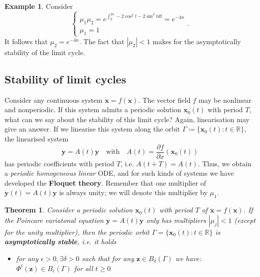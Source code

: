 \documentclass[hidelinks,a4paper, 11pt]{article}
\theoremstyle{plain}
\newtheorem{theorem}{Theorem}
\theoremstyle{break}
\theoremstyle{plain}
\theoremstyle{definition}
\newtheorem*{example}{Example}
\begin{document}
{\begin{example}
	Consider
	\[
		\begin{cases}
			\mu_1 \mu_2 = e^{\int^{2\pi}_0 -2\cos^2t - 2\sin^2 t dt} = e^{-4n} \\
			\mu_1 = 1
		\end{cases}.
	\]
	It follows that $\mu_2 = e^{-4n}$. The fact that $|\mu_2| < 1$ makes for the asymptotically stability of the limit cycle.
\end{example}

 
\subsection{Stability of limit cycles}

Consider any continuous system $\mathbf{\dot x} = f(\mathbf x)$. The vector field $f$ may be nonlinear and nonperiodic. If this system admits a periodic solution $\mathbf x_0(t)$ with period $T$, what can we say about the stability of this limit cycle? Again, linearisation may give an answer. If we linearise this system along the orbit $\Gamma \coloneqq \{ \mathbf x_0(t) : t \in \mathbb R \}$, the linearised system
\[
	\mathbf{\dot y} = A(t)\mathbf y \quad \text{with} \quad A(t) = \frac{\partial f}{\partial x}(\mathbf x_0(t)) \tag{Poincare variational equation}
\] 
has periodic coefficients with period $T$, i.e. $A(t+T) = A(t)$. Thus, we obtain a \emph{periodic homogeneous linear} ODE, and for such kinds of systems we have developed the \textbf{Floquet theory}. Remember that one multiplier of $\mathbf{\dot y}(t) = A(t)\mathbf y$ is always unity; we will denote this multiplier by $\mu_1$.

\begin{theorem}\label{chapter:poincare-map-theorem}
	Consider a periodic solution $\mathbf x_0(t)$ with period $T$ of $\mathbf{\dot x} = f(\mathbf x)$. If the Poincare variatonal equation $\mathbf{\dot y} = A(t)\mathbf y$ only has multipliers $|\mu_j| < 1$ (except for the unity multiplier), then the periodic orbit $\Gamma = \{ \mathbf x_0(t) : t \in \mathbb R \}$ is \textbf{asymptotically stable}, i.e. it holds
	\begin{itemize}
		\item for any $\epsilon >0, \exists \delta > 0$ such that for any $\mathbf z \in B_{\delta}(\Gamma)$ we have: $\Phi^t(\mathbf z) \in B_{\epsilon}(\Gamma)$ for all $t \geq 0$
		

\end{itemize}
\end{theorem}}
\end{document}
